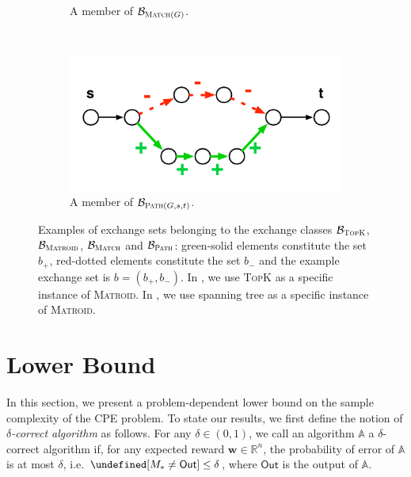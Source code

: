 \documentclass{article}
\newcommand{\Problem}{{CPE}\xspace}
\newcommand{\M}{\mathcal M}
\newcommand{\B}{\mathcal B}
\newcommand{\RR}{\mathbb R}
\newcommand{\out}{\mathsf{Out}}
\let\Pr\undefined
\DeclareMathOperator{\Pr}{Pr}
\newcommand{\MultiIdent}{\textsc{TopK}\xspace}
\newcommand{\Matroid}{\textsc{Matroid}\xspace}
\newcommand{\Match}{\textsc{Match}\xspace}
\newcommand{\Path}{\textsc{Path}\xspace}
\renewcommand{\vec}[1]{\boldsymbol{#1}}
\begin{document}
{\begin{figure}[tb]
\begin{subfigure}[c]{0.22\textwidth}
	\caption{A member of $\B_{\Match(G)}$.}
\end{subfigure}
~
\begin{subfigure}[c]{0.22\textwidth}
	\includegraphics[width=\textwidth]{fig/exchange-path}
	\caption{A member of $\B_{\Path(G,s,t)}$.}
\end{subfigure}
\caption{
Examples of exchange sets belonging to the exchange classes $\B_{\MultiIdent}$, $\B_{\Matroid}$, $\B_{\Match}$ and $\B_{\Path}$:
green-solid elements constitute the set $b_+$, red-dotted elements constitute the set $b_-$ and the example exchange set is $b=(b_+,b_-)$. 
In , we use \MultiIdent as a specific instance of \Matroid.
In , we use spanning tree as a specific instance of \Matroid.
}
\label{fig:exchange}
\end{figure}
}






\vspace{-0.7em}
\section{Lower Bound}
\vspace{-0.7em}
In this section, we present a problem-dependent lower bound on the sample complexity of the \Problem problem. 
To state our results, we first define the notion of \emph{$\delta$-correct algorithm} as follows.
For any $\delta \in (0,1)$, we call an algorithm $\mathbb A$ a $\delta$-correct algorithm if, for any expected reward $\vec w \in \RR^{n}$, the probability of error of $\mathbb A$ is at most $\delta$, i.e. $\Pr[M_*\not =\out] \le \delta$, where $\out$ is the output of $\mathbb A$.
\end{document}
